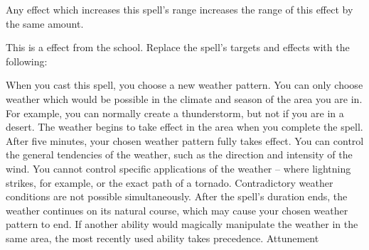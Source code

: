 \par Any effect which increases this spell's range increases the range of this effect by the same amount.
\par
This is a  effect from the  school.
Replace the spell's targets and effects with the following:
\begin{spellcontent}
\begin{augmenttargetinginfo}
\end{augmenttargetinginfo}
\begin{augmenteffects}
\spelleffect
When you cast this spell, you choose a new weather pattern.
You can only choose weather which would be possible in the climate and season of the area you are in.
For example, you can normally create a thunderstorm, but not if you are in a desert.
The weather begins to take effect in the area when you complete the spell.
After five minutes, your chosen weather pattern fully takes effect.
You can control the general tendencies of the weather, such as the direction and intensity of the wind.
You cannot control specific applications of the weather -- where lightning strikes, for example, or the exact path of a tornado.
Contradictory weather conditions are not possible simultaneously.
After the spell's duration ends, the weather continues on its natural course, which may cause your chosen weather pattern to end.
If another ability would magically manipulate the weather in the same area, the most recently used ability takes precedence.
\spelldur Attunement
\end{augmenteffects}
\end{spellcontent}
